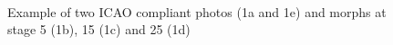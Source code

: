 \cite{vukadinovic2005fully}
\begin{figure} 
	\centering
	\label{1a}\hfill
	\label{1b}\\

	\caption{Example of two ICAO compliant photos (1a and 1e) and morphs at stage 5 (1b), 15 (1c) and 25 (1d)}
	\label{fig1} 
\end{figure}

